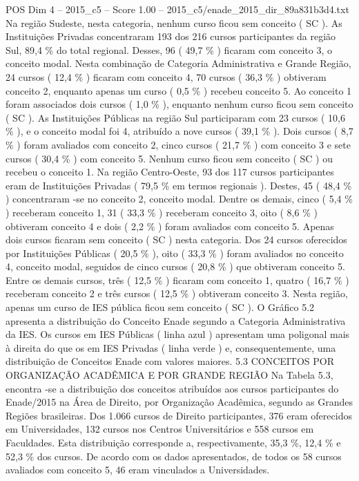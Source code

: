 \begin{textsample}{POS Dim 4 – 2015\_c5 – Score 1.00 – 2015\_c5/enade\_2015\_dir\_89a831b3d4.txt}
Na região Sudeste, nesta categoria, nenhum curso ficou sem conceito ( SC ).
As Instituições Privadas concentraram 193 dos 216 cursos participantes da região Sul, 89,4 \% do total regional.
Desses, 96 ( 49,7 \% ) ficaram com conceito 3, o conceito modal.
Nesta combinação de Categoria Administrativa e Grande Região, 24 cursos ( 12,4 \% ) ficaram com conceito 4, 70 cursos ( 36,3 \% ) obtiveram conceito 2, enquanto apenas um curso ( 0,5 \% ) recebeu conceito 5.
Ao conceito 1 foram associados dois cursos ( 1,0 \% ), enquanto nenhum curso ficou sem conceito ( SC ).
As Instituições Públicas na região Sul participaram com 23 cursos ( 10,6 \% ), e o conceito modal foi 4, atribuído a nove cursos ( 39,1 \% ).
Dois cursos ( 8,7 \% ) foram avaliados com conceito 2, cinco cursos ( 21,7 \% ) com conceito 3 e sete cursos ( 30,4 \% ) com conceito 5.
Nenhum curso ficou sem conceito ( SC ) ou recebeu o conceito 1.
Na região Centro-Oeste, 93 dos 117 cursos participantes eram de Instituições Privadas ( 79,5 \% em termos regionais ).
Destes, 45 ( 48,4 \% ) concentraram -se no conceito 2, conceito modal.
Dentre os demais, cinco ( 5,4 \% ) receberam conceito 1, 31 ( 33,3 \% ) receberam conceito 3, oito ( 8,6 \% ) obtiveram conceito 4 e dois ( 2,2 \% ) foram avaliados com conceito 5.
Apenas dois cursos ficaram sem conceito ( SC ) nesta categoria.
Dos 24 cursos oferecidos por Instituições Públicas ( 20,5 \% ), oito ( 33,3 \% ) foram avaliados no conceito 4, conceito modal, seguidos de cinco cursos ( 20,8 \% ) que obtiveram conceito 5.
Entre os demais cursos, três ( 12,5 \% ) ficaram com conceito 1, quatro ( 16,7 \% ) receberam conceito 2 e três cursos ( 12,5 \% ) obtiveram conceito 3.
Nesta região, apenas um curso de IES pública ficou sem conceito ( SC ).
O Gráfico 5.2 apresenta a distribuição do Conceito Enade segundo a Categoria Administrativa da IES.
Os cursos em IES Públicas ( linha azul ) apresentam uma poligonal mais à direita do que os em IES Privadas ( linha verde ) e, consequentemente, uma distribuição de Conceitos Enade com valores maiores. 5.3 CONCEITOS POR ORGANIZAÇÃO ACADÊMICA E POR GRANDE REGIÃO Na Tabela 5.3, encontra -se a distribuição dos conceitos atribuídos aos cursos participantes do Enade/2015 na Área de Direito, por Organização Acadêmica, segundo as Grandes Regiões brasileiras.
Dos 1.066 cursos de Direito participantes, 376 eram oferecidos em Universidades, 132 cursos nos Centros Universitários e 558 cursos em Faculdades.
Esta distribuição corresponde a, respectivamente, 35,3 \%, 12,4 \% e 52,3 \% dos cursos.
De acordo com os dados apresentados, de todos os 58 cursos avaliados com conceito 5, 46 eram vinculados a Universidades.

\end{textsample}
